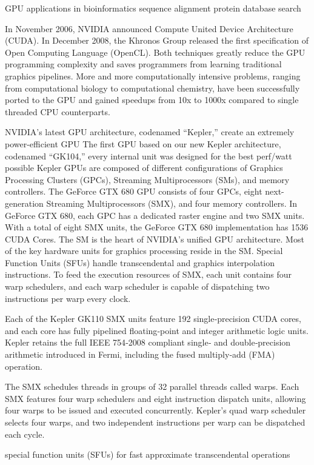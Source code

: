 GPU applications in bioinformatics
  sequence alignment \citep{123,1064}
  protein database search \citep{189}

In November 2006, NVIDIA announced Compute United Device Architecture (CUDA). In December 2008, the Khronos Group released the first specification of Open Computing Language (OpenCL). Both techniques greatly reduce the GPU programming complexity and saves programmers from learning traditional graphics pipelines. More and more computationally intensive problems, ranging from computational biology to computational chemistry, have been successfully ported to the GPU and gained speedups from 10x to 1000x compared to single threaded CPU counterparts.

NVIDIA’s latest GPU architecture, codenamed “Kepler,” create an extremely power-efficient GPU
The first GPU based on our new Kepler architecture, codenamed “GK104,” every internal unit was designed for the best perf/watt possible
Kepler GPUs are composed of different configurations of Graphics Processing Clusters (GPCs), Streaming Multiprocessors (SMs), and memory controllers. The GeForce GTX 680 GPU consists of four GPCs, eight next-generation Streaming Multiprocessors (SMX), and four memory controllers. In GeForce GTX 680, each GPC has a dedicated raster engine and two SMX units. With a total of eight SMX units, the GeForce GTX 680 implementation has 1536 CUDA Cores. The SM is the heart of NVIDIA’s unified GPU architecture. Most of the key hardware units for graphics processing reside in the SM. Special Function Units (SFUs) handle transcendental and graphics interpolation instructions. To feed the execution resources of SMX, each unit contains four warp schedulers, and each warp scheduler is capable of dispatching two instructions per warp every clock.

Each of the Kepler GK110 SMX units feature 192 single‐precision CUDA cores, and each core has fully pipelined floating‐point and integer arithmetic logic units. Kepler retains the full IEEE 754‐2008 compliant single‐ and double‐precision arithmetic introduced in Fermi, including the fused multiply‐add (FMA) operation.

The SMX schedules threads in groups of 32 parallel threads called warps. Each SMX features four warp schedulers and eight instruction dispatch units, allowing four warps to be issued and executed concurrently. Kepler’s quad warp scheduler selects four warps, and two independent instructions per warp can be dispatched each cycle.

special function units (SFUs) for fast approximate transcendental operations

